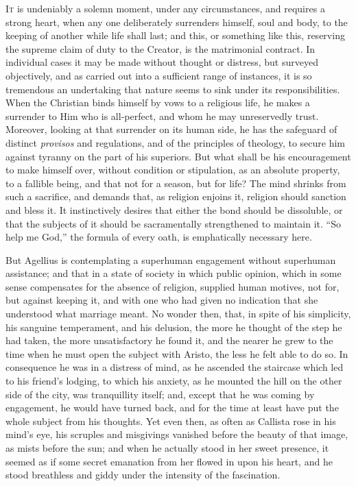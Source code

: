 I\textsc{t} is undeniably a solemn moment, under any circumstances,
and requires a strong heart, when any one deliberately surrenders
himself, soul and body, to the keeping of another while life shall
last; and this, or something like this, reserving the supreme claim of
duty to the Creator, is the matrimonial contract. In individual cases
it may be made without thought or distress, but surveyed objectively,
and as carried out into a sufficient range of instances, it is so
tremendous an undertaking that nature seems to sink under its
responsibilities. When the Christian binds himself by vows to a
religious life, he makes a surrender to Him who is all-perfect, and
whom he may unreservedly trust. Moreover, looking at that surrender on
its human side, he has the safeguard of distinct \emph{provisos} and
regulations, and of the principles of theology, to secure him against
tyranny on the part of his superiors. But what shall be his
encouragement to make himself over, without condition or stipulation,
as an absolute property, to a fallible being, and that not for a
season, but for life? The mind shrinks from such a sacrifice, and
demands that, as religion enjoins it, religion should sanction
and bless it. It instinctively desires that either the bond should be
dissoluble, or that the subjects of it should be sacramentally
strengthened to maintain it. ``So help me God,'' the formula
of every oath, is emphatically necessary here.

But Agellius is contemplating a superhuman engagement without
superhuman assistance; and that in a state of society in which public
opinion, which in some sense compensates for the absence of religion,
supplied human motives, not for, but against keeping it, and with one
who had given no indication that she understood what marriage meant.
No wonder then, that, in spite of his simplicity, his sanguine
temperament, and his delusion, the more he thought of the step he had
taken, the more unsatisfactory he found it, and the nearer he grew to
the time when he must open the subject with Aristo, the less he felt
able to do so. In consequence he was in a distress of mind, as he
ascended the staircase which led to his friend's lodging, to which his
anxiety, as he mounted the hill on the other side of the city, was
tranquillity itself; and, except that he was coming by engagement, he
would have turned back, and for the time at least have put the whole
subject from his thoughts. Yet even then, as often as Callista rose in
his mind's eye, his scruples and misgivings vanished before the beauty
of that image, as mists before the sun; and when he actually stood in
her sweet presence, it seemed as if some secret emanation from her flowed in upon his heart, and he stood breathless and giddy under
the intensity of the fascination.

